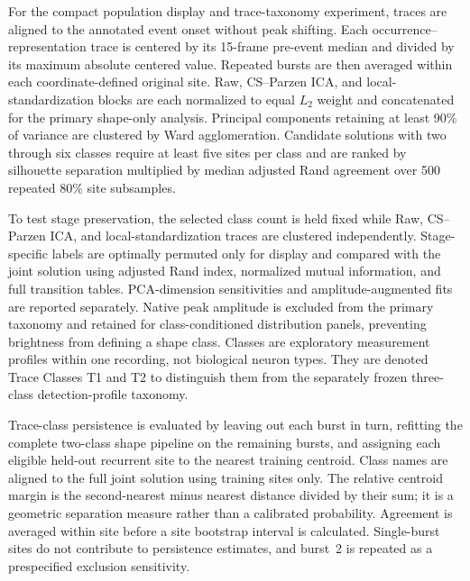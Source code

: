 For the compact population display and trace-taxonomy experiment, traces are
aligned to the annotated event onset without peak shifting. Each
occurrence--representation trace is centered by its 15-frame pre-event median
and divided by its maximum absolute centered value. Repeated bursts are then
averaged within each coordinate-defined original site. Raw, CS--Parzen ICA,
and local-standardization blocks are each normalized to equal $L_2$ weight and
concatenated for the primary shape-only analysis. Principal components
retaining at least 90\% of variance are clustered by Ward agglomeration.
Candidate solutions with two through six classes require at least five sites
per class and are ranked by silhouette separation multiplied by median
adjusted Rand agreement over 500 repeated 80\% site subsamples.

To test stage preservation, the selected class count is held fixed while Raw,
CS--Parzen ICA, and local-standardization traces are clustered independently.
Stage-specific labels are optimally permuted only for display and compared
with the joint solution using adjusted Rand index, normalized mutual
information, and full transition tables. PCA-dimension sensitivities and
amplitude-augmented fits are reported separately. Native peak amplitude is
excluded from the primary taxonomy and retained for class-conditioned
distribution panels, preventing brightness from defining a shape class.
Classes are exploratory measurement profiles within one recording, not
biological neuron types. They are denoted Trace Classes T1 and T2 to
distinguish them from the separately frozen three-class detection-profile
taxonomy.

Trace-class persistence is evaluated by leaving out each burst in turn,
refitting the complete two-class shape pipeline on the remaining bursts, and
assigning each eligible held-out recurrent site to the nearest training
centroid. Class names are aligned to the full joint solution using training
sites only. The relative centroid margin is the second-nearest minus nearest
distance divided by their sum; it is a geometric separation measure rather
than a calibrated probability. Agreement is averaged within site before a
site bootstrap interval is calculated. Single-burst sites do not contribute to
persistence estimates, and burst~2 is repeated as a prespecified exclusion
sensitivity.

